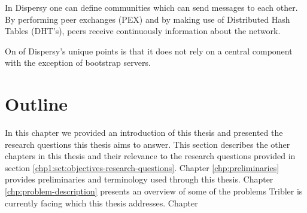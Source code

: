 In Dispersy one can define communities which can send messages to each other.
By performing peer exchanges (PEX) and by making use of Distributed Hash Tables (DHT's), peers receive continuously information about the network.

On of Dispersy's unique points is that it does not rely on a central component with the exception of bootstrap servers.

\section{Outline}
In this chapter we provided an introduction of this thesis and presented the research questions this thesis aims to answer. 
This section describes the other chapters in this thesis and their relevance to the research questions provided in section \ref{chp1:sct:objectives-research-questions}.
Chapter \ref{chp:preliminaries} provides preliminaries and terminology used through this thesis.
Chapter \ref{chp:problem-description} presents an overview of some of the problems Tribler is currently facing which this thesis addresses.
Chapter 
